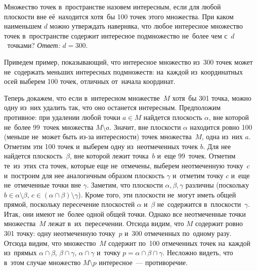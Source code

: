 \problem
Множество точек в~пространстве назовем интересным, если для любой плоскости вне
её~находится хотя~бы 100 точек этого множества.
При каком наименьшем $d$ можно утверждать наверняка, что любое интересное
множество точек в~пространстве содержит интересное подмножество не~более чем
с~$d$~точками?
\solution
\emph{Ответ:} $d = 300$.
\par
Приведем пример, показывающий, что интересное множество из~300 точек может
не~содержать меньших интересных подмножеств: на~каждой из~координатных осей
выберем 100 точек, отличных от~начала координат.
\par
Теперь докажем, что если в~интересном множестве~$M$ хотя~бы 301 точка, можно
одну из~них удалить так, что оно останется интересным.
Предположим противное: при удалении любой точки $a \in M$ найдется плоскость
$\alpha$, вне которой не~более 99~точек множества $M \setminus a$.
Значит, вне плоскости $\alpha$ находится ровно 100 (меньше не~может быть
из-за интересности) точек множества~$M$, одна из~них $a$.
Отметим эти 100 точек и~выберем одну из~неотмеченных точек $b$.
Для нее найдется плоскость~$\beta$, вне которой лежит точка~$b$ и~еще
99~точек.
Отметим те~из~этих ста точек, которые еще не~отмечены, выберем неотмеченную
точку~$c$ и~построим для нее аналогичным образом плоскость $\gamma$ и~отметим
точку $c$ и~еще не~отмеченные точки вне $\gamma$.
Заметим, что плоскости $\alpha, \beta, \gamma$ различны (поскольку
$b \in \alpha \setminus \beta$, $c \in (\alpha \cap \beta) \setminus \gamma$).
Кроме того, эти плоскости не~могут иметь общей прямой, поскольку пересечение
плоскостей $\alpha$ и~$\beta$ не~содержится в~плоскости~$\gamma$.
Итак, они имеют не~более одной общей точки.
Однако все неотмеченные точки множества~$M$ лежат в~их~пересечении.
Отсюда видим, что $M$ содержит ровно 301 точку: одну неотмеченную точку~$p$
и~300 отмеченных по~одному разу.
Отсюда видим, что множество~$M$ содержит по~100 отмеченных точек на~каждой
из~прямых $\alpha \cap \beta$, $\beta \cap \gamma$, $\alpha \cap \gamma$
и~точку $p = \alpha \cap \beta \cap \gamma$.
Несложно видеть, что в~этом случае множество $M \setminus p$ интересное~---
противоречие.
\endproblem
